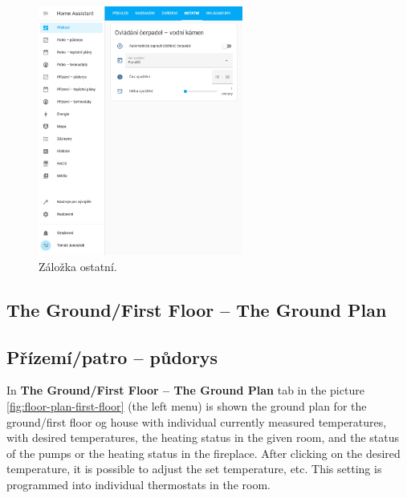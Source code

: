 \begin{Czech}
\begin{figure}[H]
    \centering
    \includegraphics[width=0.6\textwidth]{pictures/czech/software/others-tab.png}
    \caption{Záložka ostatní.}
    \label{fig:tab-others}
\end{figure}
\end{Czech}


\newpage
\begin{English}
\subsection{The Ground/First Floor – The Ground Plan}
\end{English}

\begin{Czech}
\subsection{Přízemí/patro – půdorys}
\end{Czech}


\begin{English}
In \textbf{The Ground/First Floor – The Ground Plan} tab in the picture \ref{fig:floor-plan-first-floor} (the left menu) is shown the ground plan for the ground/first floor og house with individual currently measured temperatures, with desired temperatures, the heating status in the given room, and the status of the pumps or the heating status in the fireplace. After clicking on the desired temperature, it is possible to adjust the set temperature, etc. This setting is programmed into individual thermostats in the room.
\end{English}

